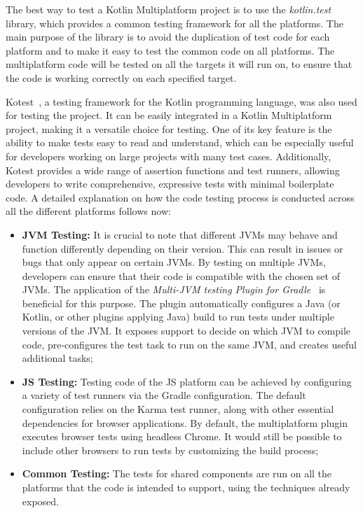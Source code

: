 The best way to test a Kotlin Multiplatform project is to use the \textit{kotlin.test} library, which provides a common testing framework for all the platforms. The main purpose of the library is to avoid the duplication of test code for each platform and to make it easy to test the common code on all platforms. The multiplatform code will be tested on all the targets it will run on, to ensure that the code is working correctly on each specified target.\newline

Kotest~\cite{KotestKo71:online}, a testing framework for the Kotlin programming language, was also used for testing the project. It can be easily integrated in a Kotlin Multiplatform project, making it a versatile choice for testing. One of its key feature is the ability to make tests easy to read and understand, which can be especially useful for developers working on large projects with many test cases. Additionally, Kotest provides a wide range of assertion functions and test runners, allowing developers to write comprehensive, expressive tests with minimal boilerplate code. A detailed explanation on how the code testing process is conducted across all the different platforms follows now:
\begin{itemize}
	\item \textbf{JVM Testing:} It is crucial to note that different JVMs may behave and function differently depending on their version. This can result in issues or bugs that only appear on certain JVMs. By testing on multiple JVMs, developers can ensure that their code is compatible with the chosen set of JVMs. The application of the \textit{Multi-JVM testing Plugin for Gradle}~\cite{DanySKmu38:online} is beneficial for this purpose. The plugin automatically configures a Java (or Kotlin, or other plugins applying Java) build to run tests under multiple versions of the JVM. It exposes support to decide on which JVM to compile code, pre-configures the test task to run on the same JVM, and creates useful additional tasks;
	\item \textbf{JS Testing:} Testing code of the JS platform can be achieved by configuring a variety of test runners via the Gradle configuration. The default configuration relies on the Karma test runner, along with other essential dependencies for browser applications. By default, the multiplatform plugin executes browser tests using headless Chrome. It would still be possible to include other browsers to run tests by customizing the build process;
	\item \textbf{Common Testing:} The tests for shared components are run on all the platforms that the code is intended to support, using the techniques already exposed.
\end{itemize}

